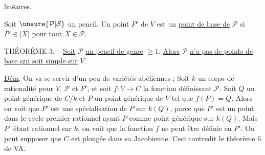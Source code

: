 linéaires.

Soit $\unsure{\mathcal P|\mathcal S}$ un pencil. Un point $P'$ de $V$ est un \uline{point de base de} $\mathcal P$ si $P'\in|X|$ pour tout $X\in\mathcal P$.

THÉORÈME 3. -- \uline{Soit} $\mathcal P$ \uline{un pencil de genre} $\geq1$. \uline{Alors} $\mathcal P$ \uline{n'a pas de points de base qui soit simple sur} $V$.

\uline{Dém}. On va se servir d'un peu de variétés abéliennes ; Soit $k$ un corps de rationalité pour $V$, $\mathcal P$ et $P'$, et soit $f:V\longrightarrow C$ la fonction définissant $\mathcal P$. Soit $Q$ un point générique de $C/k$ et $P$ un point générique de $V$ tel que $f(P)=Q$. Alors on voit que $P'$ est une spécialisation de $P$ sur $k(Q)$, parce que $P'$ est un point dans le cycle premier rationnel ayant $P$ comme point générique sur $k(Q)$. Mais $P'$ étant rationnel sur $k$, on voit que la fonction $f$ ne peut être définie en $P'$. On peut supposer que $C$ est plongée dans sa Jacobienne. Ceci contredit le théorème 6 de VA.

